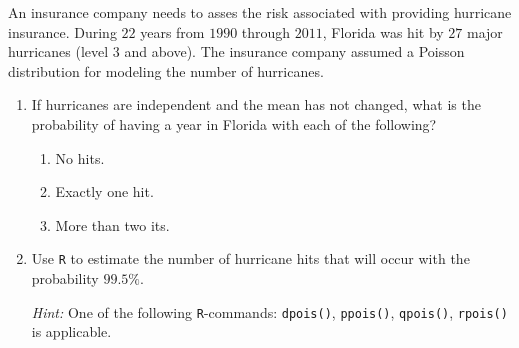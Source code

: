 
\begin{exercise}

An insurance company needs to asses the risk associated with providing hurricane insurance.
During $22$ years from $1990$ through $2011$, Florida was hit by $27$ major hurricanes (level $3$ and above).
The insurance company assumed a Poisson distribution for modeling the number of hurricanes.

\begin{enumerate}[label = (\alph*)]

    \item If hurricanes are independent and the mean has not changed, what is the probability of having a year in Florida with each of the following?

    \begin{enumerate}[label = (\arabic*)]
        \item No hits.
        \item Exactly one hit.
        \item More than two its.
    \end{enumerate}

    \item Use \texttt R to estimate the number of hurricane hits that will occur with the probability $99.5 \%$.

    \textit{Hint:}
    One of the following \texttt R-commands:
    \texttt{dpois()}, \texttt{ppois()}, \texttt{qpois()}, \texttt{rpois()} is applicable.

\end{enumerate}

\end{exercise}



